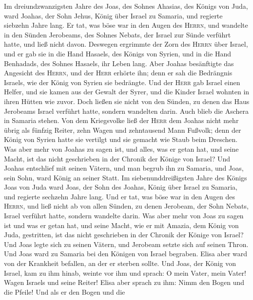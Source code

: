  Im dreiundzwanzigsten Jahre des Joas, des Sohnes Ahasias,
des Königs von Juda, ward Joahas, der Sohn Jehus, König über Israel zu
Samaria, und regierte siebzehn Jahre lang.  Er tat, was
böse war in den Augen des \textsc{Herrn}, und wandelte in den Sünden
Jerobeams, des Sohnes Nebats, der Israel zur Sünde verführt hatte, und
ließ nicht davon.  Deswegen ergrimmte der Zorn des
\textsc{Herrn} über Israel, und er gab sie in die Hand Hasaels, des
Königs von Syrien, und in die Hand Benhadads, des Sohnes Hasaels, ihr
Leben lang.  Aber Joahas besänftigte das Angesicht des
\textsc{Herrn}, und der \textsc{Herr} erhörte ihn; denn er sah die
Bedrängnis Israels, wie der König von Syrien sie bedrängte.
 Und der \textsc{Herr} gab Israel einen Helfer, und sie
kamen aus der Gewalt der Syrer, und die Kinder Israel wohnten in ihren
Hütten wie zuvor.  Doch ließen sie nicht von den Sünden,
zu denen das Haus Jerobeams Israel verführt hatte, sondern wandelten
darin. Auch blieb die Aschera in Samaria stehen.  Von dem
Kriegsvolke ließ der \textsc{Herr} dem Joahas nicht mehr übrig als
fünfzig Reiter, zehn Wagen und zehntausend Mann Fußvolk; denn der König
von Syrien hatte sie vertilgt und sie gemacht wie Staub beim Dreschen.
 Was aber mehr von Joahas zu sagen ist, und alles, was er
getan hat, und seine Macht, ist das nicht geschrieben in der Chronik der
Könige von Israel?  Und Joahas entschlief mit seinen
Vätern, und man begrub ihn zu Samaria, und Joas, sein Sohn, ward König
an seiner Statt.  Im siebenunddreißigsten Jahre des
Königs Joas von Juda ward Joas, der Sohn des Joahas, König über Israel
zu Samaria, und regierte sechzehn Jahre lang.  Und er
tat, was böse war in den Augen des \textsc{Herrn}, und ließ nicht ab von
allen Sünden, zu denen Jerobeam, der Sohn Nebats, Israel verführt hatte,
sondern wandelte darin.  Was aber mehr von Joas zu sagen
ist und was er getan hat, und seine Macht, wie er mit Amazia, dem König
von Juda, gestritten, ist das nicht geschrieben in der Chronik der
Könige von Israel?  Und Joas legte sich zu seinen Vätern,
und Jerobeam setzte sich auf seinen Thron. Und Joas ward zu Samaria bei
den Königen von Israel begraben.  Elisa aber ward von der
Krankheit befallen, an der er sterben sollte. Und Joas, der König von
Israel, kam zu ihm hinab, weinte vor ihm und sprach: O mein Vater, mein
Vater! Wagen Israels und seine Reiter!  Elisa aber sprach
zu ihm: Nimm den Bogen und die Pfeile! Und als er den Bogen und die
